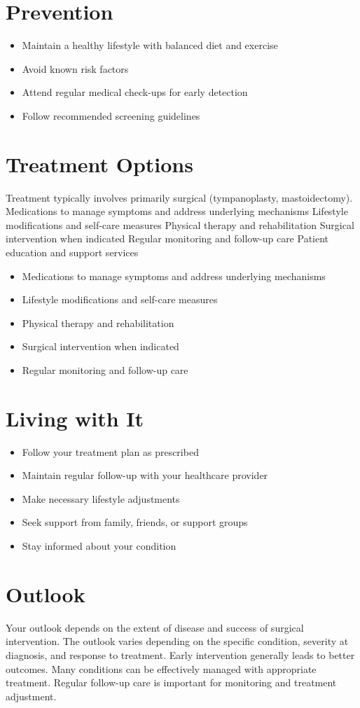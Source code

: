 \section{Prevention}
\begin{itemize}[noitemsep]
  \item Maintain a healthy lifestyle with balanced diet and exercise
  \item Avoid known risk factors
  \item Attend regular medical check-ups for early detection
  \item Follow recommended screening guidelines
\end{itemize}
\section{Treatment Options}
Treatment typically involves primarily surgical (tympanoplasty, mastoidectomy). Medications to manage symptoms and address underlying mechanisms Lifestyle modifications and self-care measures Physical therapy and rehabilitation Surgical intervention when indicated Regular monitoring and follow-up care Patient education and support services

\begin{itemize}[noitemsep]
  \item Medications to manage symptoms and address underlying mechanisms
  \item Lifestyle modifications and self-care measures
  \item Physical therapy and rehabilitation
  \item Surgical intervention when indicated
  \item Regular monitoring and follow-up care
\end{itemize}
\section{Living with It}
\begin{itemize}[noitemsep]
  \item Follow your treatment plan as prescribed
  \item Maintain regular follow-up with your healthcare provider
  \item Make necessary lifestyle adjustments
  \item Seek support from family, friends, or support groups
  \item Stay informed about your condition
\end{itemize}
\section{Outlook}
Your outlook depends on the extent of disease and success of surgical intervention. The outlook varies depending on the specific condition, severity at diagnosis, and response to treatment. Early intervention generally leads to better outcomes. Many conditions can be effectively managed with appropriate treatment. Regular follow-up care is important for monitoring and treatment adjustment.

